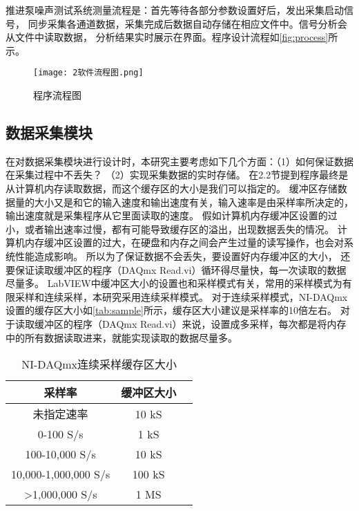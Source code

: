 推进泵噪声测试系统测量流程是：首先等待各部分参数设置好后，发出采集启动信号，
同步采集各通道数据，采集完成后数据自动存储在相应文件中。信号分析会从文件中读取数据，
分析结果实时展示在界面。程序设计流程如\autoref{fig:process}所示。
\begin{figure}[htbp]
    \centering
    \texttt{[image: 2软件流程图.png]}
    \caption{\label{fig:process}程序流程图}
\end{figure}

\begin{comment}
\subsection{系统设置模块}
软件界面的设置模块提供了测试系统各项参数设定，包括采集通道设置、采样参数设置、
传感器灵敏度设置、分析参数设置等。
\begin{figure}[htbp]
    \centering
    \texttt{[image: 2系统设置.png]}
    \caption{\label{fig:setting}系统设置}
\end{figure}
\end{comment}

\subsection{数据采集模块}
在对数据采集模块进行设计时，本研究主要考虑如下几个方面：（1）如何保证数据在采集过程中不丢失？
（2）实现采集数据的实时存储。
在2.2节提到程序最终是从计算机内存读取数据，而这个缓存区的大小是我们可以指定的。
缓冲区存储数据量的大小又是和它的输入速度和输出速度有关，输入速率是由采样率所决定的，
输出速度就是采集程序从它里面读取的速度。
假如计算机内存缓冲区设置的过小，或者输出速率过慢，都有可能导致缓存区的溢出，出现数据丢失的情况。
计算机内存缓冲区设置的过大，在硬盘和内存之间会产生过量的读写操作，也会对系统性能造成影响。
所以为了保证数据不会丢失，要设置好内存缓冲区的大小，
还要保证读取缓冲区的程序（DAQmx Read.vi）循环得尽量快，每一次读取的数据尽量多。
LabVIEW中缓冲区大小的设置也和采样模式有关，常用的采样模式为有限采样和连续采样，本研究采用连续采样模式。
对于连续采样模式，NI-DAQmx设置的缓存区大小如\autoref{tab:sample}所示，缓存区大小建议是采样率的10倍左右。
对于读取缓冲区的程序（DAQmx Read.vi）来说，设置成多采样，每次都是将内存中的所有数据读取进来，就能实现读取的数据尽量多。
\begin{table}[htbp]
    \centering
    \caption{\label{tab:sample}NI-DAQmx连续采样缓存区大小}
    \begin{tabular}{ccc}
     \toprule
     采样率&缓冲区大小\\
     \midrule
     未指定速率&10 kS\\
     0-100 S/s&1 kS\\
     100-10,000 S/s&10 kS\\
     10,000-1,000,000 S/s&100 kS\\
     >1,000,000 S/s&1 MS\\
     \bottomrule
    \end{tabular}
\end{table}

